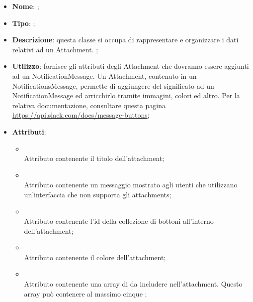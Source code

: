 \begin{itemize}
	\item \textbf{Nome}: ;
	\item \textbf{Tipo}: ;
	\item \textbf{Descrizione}: questa classe si occupa di rappresentare e organizzare i dati relativi ad un Attachment.
;
	\item \textbf{Utilizzo}: fornisce gli attributi degli Attachment che dovranno essere aggiunti ad un NotificationMessage.
Un Attachment, contenuto in un NotificationsMessage, permette di aggiungere del significato ad un NotificationMessage ed arricchirlo tramite immagini, colori ed altro.
Per la relativa documentazione, consultare questa pagina \url{https://api.slack.com/docs/message-buttons};
	\item \textbf{Attributi}:
	\begin{itemize}
		\item[]  \\
		Attributo contenente il titolo dell'attachment;
		\item[]  \\
		Attributo contenente un messaggio mostrato agli utenti che utilizzano un'interfaccia che non supporta gli attachments;
		\item[]  \\
		Attributo contenente l'id della collezione di bottoni all'interno dell'attachment;
		\item[]  \\
		Attributo contenente il colore dell'attachment;
		\item[]  \\
		Attributo contenente una array di  da includere nell'attachment. Questo array può contenere al massimo cinque ;
	\end{itemize}
\end{itemize}
\FloatBarrier

